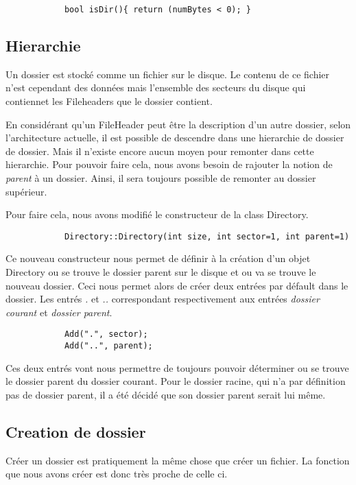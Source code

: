 \documentclass[a4paper,10pt]{article}
\begin{document}
        \begin{lstlisting}
            bool isDir(){ return (numBytes < 0); }
        \end{lstlisting}

    \subsection{Hierarchie}
        Un dossier est stocké comme un fichier sur le disque. Le contenu de ce fichier n'est
        cependant des données mais l'ensemble des secteurs du disque qui contiennet les Fileheaders que le dossier contient.

        En considérant qu'un FileHeader peut être la description d'un autre dossier, selon
        l'architecture actuelle, il est possible de descendre dans une hierarchie de dossier de
        dossier. Mais il n'existe encore aucun moyen pour remonter dans cette hierarchie. Pour
        pouvoir faire cela, nous avons besoin de rajouter la notion de \textit{parent} à un dossier.
        Ainsi, il sera toujours possible de remonter au dossier supérieur.

        Pour faire cela, nous avons modifié le constructeur de la class Directory.
        \begin{lstlisting}
            Directory::Directory(int size, int sector=1, int parent=1)
        \end{lstlisting}

        Ce nouveau constructeur nous permet de définir à la création d'un objet Directory ou se
        trouve le dossier parent sur le disque et ou va se trouve le nouveau dossier. Ceci nous permet alors de créer deux entrées par défault dans le dossier. Les entrés \textit{.} et
        \textit{..} correspondant respectivement aux entrées \textit{dossier courant} et
        \textit{dossier parent}.

        \begin{lstlisting}
            Add(".", sector);
            Add("..", parent);
        \end{lstlisting}

        Ces deux entrés vont nous permettre de toujours pouvoir déterminer ou se trouve le dossier
        parent du dossier courant. Pour le dossier racine, qui n'a par définition pas de dossier
        parent, il a été décidé que son dossier parent serait lui même.


    \subsection{Creation de dossier}
        Créer un dossier est pratiquement la même chose que créer un fichier. La fonction
        \textit{} que nous avons créer est donc très proche de celle ci.
\end{document}
